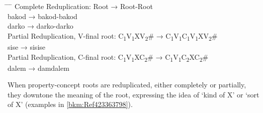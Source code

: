 \ea
\begin{tabbing}
\hspace{4cm} \= \hspace{1cm} \= \hspace{1cm} \= \hspace{.1cm} \kill
Complete Reduplication: \>  Root\> → Root-Root \\
       \> bakod\> → bakod-bakod\footnotemark \\
       \> darko\> → darko-darko \\
Partial Reduplication, V-final root:  C\textsubscript{1}V\textsubscript{1}XV\textsubscript{2}\# → C\textsubscript{1}V\textsubscript{1}C\textsubscript{1}V\textsubscript{1}XV\textsubscript{2}\# \\
 \>             sise\> → sisise \\
Partial Reduplication, C-final root:  C\textsubscript{1}V\textsubscript{1}XC\textsubscript{2}\# → C\textsubscript{1}V\textsubscript{1}C\textsubscript{2}XC\textsubscript{2}\# \\
\>              dalem\> → damdalem
\end{tabbing}
\z

When property-concept roots are reduplicated, either completely or partially, they downtone the meaning of the root, expressing the idea of ‘kind of X’ or ‘sort of X’ (examples in \ref{bkm:Ref423363798}).

